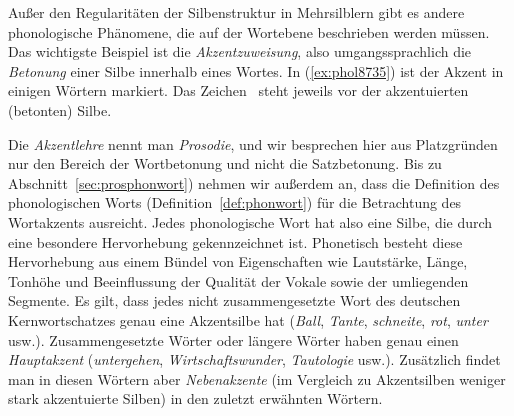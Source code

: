 Außer den Regularitäten der Silbenstruktur in Mehrsilblern gibt es andere phonologische Phänomene, die auf der Wortebene beschrieben werden müssen.
Das wichtigste Beispiel ist die \textit{Akzentzuweisung}, also umgangssprachlich die \textit{Betonung} einer Silbe innerhalb eines Wortes.
In (\ref{ex:phol8735}) ist der Akzent in einigen Wörtern markiert.
Das Zeichen \Akz\ steht jeweils vor der akzentuierten (betonten) Silbe.

\begin{exe}
  \ex\label{ex:phol8735}
  \begin{xlist}
  \end{xlist}
\end{exe}

Die \textit{Akzentlehre} nennt man \textit{Prosodie}, und wir besprechen hier aus Platzgründen nur den Bereich der Wortbetonung und \zB nicht die Satzbetonung.
Bis zu Abschnitt~\ref{sec:prosphonwort}) nehmen wir außerdem an, dass die Definition des phonologischen Worts (Definition~\ref{def:phonwort}) für die Betrachtung des Wortakzents ausreicht.
Jedes phonologische Wort hat also eine Silbe, die durch eine besondere Hervorhebung gekennzeichnet ist.
Phonetisch besteht diese Hervorhebung aus einem Bündel von Eigenschaften wie Lautstärke, Länge, Tonhöhe und Beeinflussung der Qualität der Vokale sowie der umliegenden Segmente.
Es gilt, dass jedes nicht zusammengesetzte Wort des deutschen Kernwortschatzes genau eine Akzentsilbe hat (\textit{\Akz Ball}, \textit{\Akz Tante}, \textit{\Akz schneite}, \textit{\Akz rot}, \textit{\Akz unter} usw.).
Zusammengesetzte Wörter oder längere Wörter haben genau einen \textit{Hauptakzent} (\textit{\Akz untergehen}, \textit{\Akz Wirtschaftswunder}, \textit{Tautolo\Akz gie} usw.).
Zusätzlich findet man in diesen Wörtern aber \textit{Nebenakzente} (im Vergleich zu Akzentsilben weniger stark akzentuierte Silben) in den zuletzt erwähnten Wörtern.


